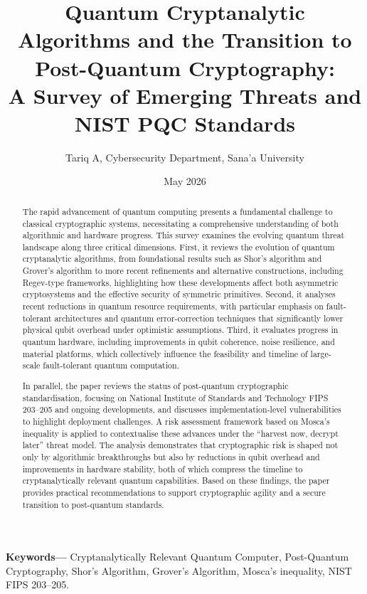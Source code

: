 \documentclass[11pt,a4paper]{article}
\title{\textbf{Quantum Cryptanalytic Algorithms and the Transition to Post-Quantum Cryptography:\\A Survey of Emerging Threats and NIST PQC Standards}}
\author{Tariq A, Cybersecurity Department, Sana’a University}
\date{May 2026}
\begin{document}
\maketitle

\begin{abstract}
The rapid advancement of quantum computing presents a fundamental challenge to classical cryptographic systems, necessitating a comprehensive understanding of both algorithmic and hardware progress. This survey examines the evolving quantum threat landscape along three critical dimensions. First, it reviews the evolution of quantum cryptanalytic algorithms, from foundational results such as Shor’s algorithm and Grover’s algorithm to more recent refinements and alternative constructions, including Regev-type frameworks, highlighting how these developments affect both asymmetric cryptosystems and the effective security of symmetric primitives. Second, it analyses recent reductions in quantum resource requirements, with particular emphasis on fault-tolerant architectures and quantum error-correction techniques that significantly lower physical qubit overhead under optimistic assumptions. Third, it evaluates progress in quantum hardware, including improvements in qubit coherence, noise resilience, and material platforms, which collectively influence the feasibility and timeline of large-scale fault-tolerant quantum computation.

In parallel, the paper reviews the status of post-quantum cryptographic standardisation, focusing on National Institute of Standards and Technology FIPS 203–205 and ongoing developments, and discusses implementation-level vulnerabilities to highlight deployment challenges. A risk assessment framework based on Mosca’s inequality is applied to contextualise these advances under the “harvest now, decrypt later” threat model. The analysis demonstrates that cryptographic risk is shaped not only by algorithmic breakthroughs but also by reductions in qubit overhead and improvements in hardware stability, both of which compress the timeline to cryptanalytically relevant quantum capabilities. Based on these findings, the paper provides practical recommendations to support cryptographic agility and a secure transition to post-quantum standards.
\end{abstract}

\textbf{Keywords—} Cryptanalytically Relevant Quantum Computer, Post-Quantum Cryptography, Shor’s Algorithm, Grover’s Algorithm, Mosca’s inequality, NIST FIPS 203–205.
\end{document}
